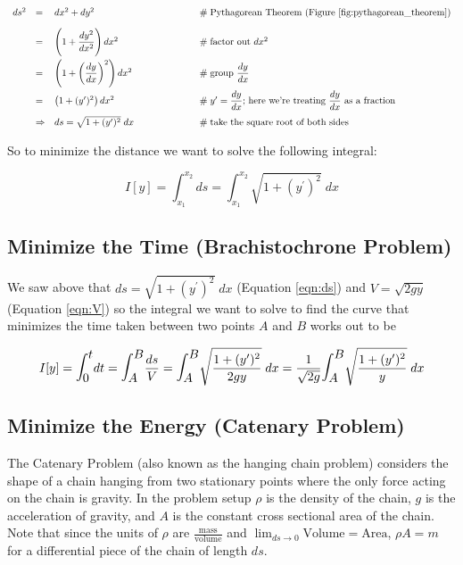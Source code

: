 \documentclass{article}
\theoremstyle{definition}
\begin{document}
\begin{equation*}
\begin{array}{lllll}
ds^2
&=& dx^2 + dy^2   												&\qquad \qquad \qquad \mathrel{\#} \text{Pythagorean Theorem (Figure \ref{fig:pythagorean_theorem})} \\
[10pt]
&=& \left ( 1 + \dfrac{dy^2}{dx^2} \right ) dx^2				&\qquad \qquad \qquad \mathrel{\#} \text{factor out $dx^2$} \\
[12pt]
&=& \left ( 1 + \left (\dfrac{dy}{dx} \right )^2 \right ) dx^2	&\qquad \qquad \qquad \mathrel{\#} \text{group $\dfrac{dy}{dx}$} \\
[12pt]
&=& \left ( 1 + (y^{\prime})^2 \right ) dx^2					&\qquad \qquad \qquad \mathrel{\#} \text{$y^{\prime} = \dfrac{dy}{dx}$; here we're treating $\dfrac{dy}{dx}$ as a fraction}\\
[10pt]
&\Rightarrow& ds = \sqrt{1 + (y^{\prime})^2} \; dx				&\qquad \qquad \qquad \mathrel{\#} \text{take the square root of both sides}
\end{array}
\end{equation*}


\bigskip
\noindent
So to minimize the distance we want to solve the following integral: 

\bigskip
\begin{equation*}
I[y] = \int_{x_1}^{x_2} ds = \int_{x_1}^{x_2} \sqrt{1 + (y^{\prime})^2} \; dx
\end{equation*}	

\medskip
\subsection{Minimize the Time (Brachistochrone Problem)}
We saw above that $ds = \sqrt{1 + (y^{\prime})^2} \; dx$	
(Equation \ref{eqn:ds}) and $V = \sqrt{2gy}$ (Equation 
\ref{eqn:V}) so the integral we want to solve to find the 
curve that minimizes the time taken between two points $A$ 
and $B$ works out to be 

\bigskip
\begin{equation*}
I[y]
= \mathlarger{\mathlarger{\int_0^t}} dt = \mathlarger{\mathlarger{\int_A^B}} \dfrac{ds}{V} 
= \mathlarger{\mathlarger{\int_A^B}} \sqrt{\dfrac{1 + (y^{\prime})^2}{2gy}} \; dx
= \dfrac{1}{\sqrt{2g}} \mathlarger{\mathlarger{\int_A^B}} \sqrt{\dfrac{1 + (y^{\prime})^2}{y}} \; dx
\end{equation*}

\medskip
\subsection{Minimize the Energy (Catenary Problem)}
The Catenary Problem \cite{wiki:catenary} (also known as the
hanging chain problem) considers the shape of a chain hanging
from two stationary points where the only force acting on the
chain is gravity. In the problem setup $\rho$ is the density of
the chain, $g$ is the acceleration of gravity, and $A$ is the
constant cross sectional area of the chain.  Note that since the
units of $\rho$ are $\frac{\text{mass}}{\text{volume}}$ and
${\displaystyle \lim_{ds \to 0} \text{Volume} = \text{Area}}$,
$\rho A = m$ for a differential piece of the chain of length
$ds$.
\end{document}

